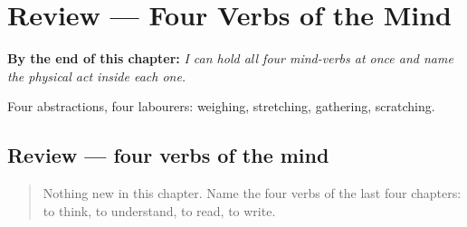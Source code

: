
\chapter{Review --- Four Verbs of the Mind}
\label{ch:spanish-review-verbs-of-mind}

\begin{chapteropening}
\textbf{By the end of this chapter:} \emph{I can hold all four mind-verbs at once and name the physical act inside each one.}

Four abstractions, four labourers: weighing, stretching, gathering, scratching.
\end{chapteropening}

\section[Practice]{Review — four verbs of the mind}

\label{lesson:ES-C34-repaso-mente}



\begin{quote}
Nothing new in this chapter. Name the four verbs of the last four chapters: to think, to understand, to read, to write.
\end{quote}


